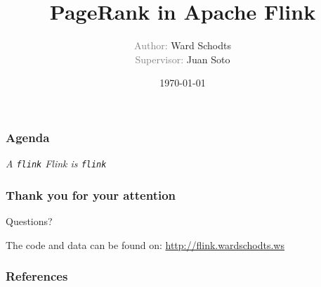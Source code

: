\documentclass[hyperref={pdfpagelayout=SinglePage}]{beamer}
\author{\textcolor{gray}{Author:} Ward Schodts\\ \textcolor{gray}{Supervisor:}
Juan Soto}
\title{PageRank in Apache Flink}
\institute{Datenbanksysteme und Informationsmanagement \\
Technische Universität Berlin \\[0.5cm]
\texttt{[image: tulogo]}}
\date{\today}
\begin{document}
\begin{frame}
\maketitle
\end{frame}

\begin{frame}
\frametitle{Agenda}
\tableofcontents
\end{frame}









\begin{frame}
\begin{center}
\LARGE \textit{A \texttt{flink} Flink is \texttt{flink}}
\end{center}
\end{frame}

\begin{frame}
\frametitle{Thank you for your attention}
\begin{center}
{\LARGE Questions?}

\end{center}
The code and data can be found on: \url{http://flink.wardschodts.ws}


\end{frame}

\begin{frame}[allowframebreaks]
		
        \frametitle{References}
        \nocite{*}
        \printbibliography

\end{frame}
\end{document}
